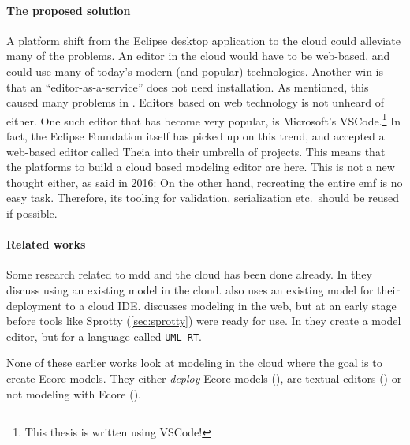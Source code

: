 \paragraph*{The proposed solution}
A platform shift from the \gls{Eclipse} desktop application to the \gls{cloud} could alleviate many of the problems. An editor in the \gls{cloud} would have to be web-based, and could use many of today's modern (and popular) technologies. 
Another win is that an ``editor-as-a-service'' does not need installation.
As mentioned, this caused many problems in \cite{jordicabotFailedConvinceMy2015}. 
Editors based on web technology is not unheard of either. One such editor that has become very popular, is Microsoft's \gls{VSCode}.\footnote{This thesis is written using \gls{VSCode}!}
In fact, the Eclipse Foundation itself has picked up on this trend, and accepted a web-based editor called \gls{Theia} into their umbrella of projects.
This means that the platforms to build a \gls{cloud} based modeling editor are here. 
This is not a new thought either, as \textcite{lajmiModelingBrowserWhat2016} said in 2016: 
On the other hand, recreating the entire \acrlong{emf} is no easy task. Therefore, its tooling for validation, serialization etc.\ should be reused if possible.


\paragraph*{Related works}


Some research related to \gls{mdd} and the \gls{cloud} has been done already.
In \cite{carrascal-manzanaresBuildingMDECloud2015} they discuss using an existing model in the cloud.
\textcite{coulonModularDistributedIDE2020} also uses an existing model for their deployment to a \gls{cloud} \acrshort{IDE}.
\textcite{sainiWebCollaborativeModelling2019} discusses modeling in the web, but at an early stage before tools like Sprotty (\cref{sec:sprotty}) were ready for use.
In \cite{walshClientagnosticHybridModel2020} they create a model editor, but for a language called \texttt{UML-RT}.

None of these earlier works look at modeling in the cloud where the goal is to create \gls{Ecore} models. They either \emph{deploy} \gls{Ecore} models (\cite{carrascal-manzanaresBuildingMDECloud2015,coulonModularDistributedIDE2020}), are textual editors (\cite{coulonModularDistributedIDE2020,sainiWebCollaborativeModelling2019}) or not modeling with \gls{Ecore} (\cite{walshClientagnosticHybridModel2020}).



